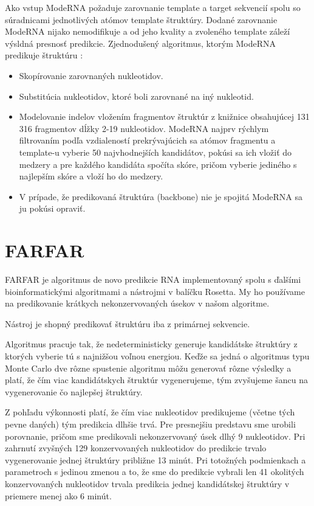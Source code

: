 \indent Ako vstup ModeRNA požaduje zarovnanie  template a target sekvencií spolu so súradnicami jednotlivých atómov template štruktúry. Dodané zarovnanie ModeRNA nijako nemodifikuje a od jeho kvality a zvoleného template záleží výsldná presnosť predikcie. 
Zjednodušený algoritmus, ktorým ModeRNA predikuje štruktúru \cite{Rother11}: 

\begin{itemize}
\item Skopírovanie zarovnaných nukleotidov.
\item Substitúcia nukleotidov, ktoré boli zarovnané na iný nukleotid.
\item Modelovanie indelov vložením fragmentov štruktúr z knižnice obsahujúcej 131 316 fragmentov dĺžky 2-19 nukleotidov. ModeRNA najprv rýchlym filtrovaním podľa vzdialeností  prekrývajúcich sa atómov fragmentu a template-u vyberie 50 najvhodnejších kandidátov, pokúsi sa ich vložiť do medzery a pre každého kandidáta spočíta skóre, pričom vyberie jediného s najlepším skóre a  vloží ho do medzery.
\item V prípade, že predikovaná štruktúra (backbone) nie je spojitá ModeRNA sa ju pokúsi opraviť.
\end{itemize}


\section{FARFAR}

FARFAR je algoritmus de novo predikcie RNA implementovaný spolu s ďalšími bioinformatickými algoritmami a nástrojmi v balíčku Rosetta. My ho používame na predikovanie krátkych nekonzervovaných úsekov v našom algoritme.  


\indent Nástroj je shopný predikovať štruktúru iba z primárnej sekvencie. 


\indent Algoritmus pracuje tak, že nedeterministicky generuje kandidátske štruktúry z ktorých vyberie tú s najnižšou voľnou energiou. Keďže sa jedná o algoritmus typu Monte Carlo dve rôzne spustenie algoritmu môžu generovať rôzne výsledky a platí, že čím viac kandidátskych štruktúr vygenerujeme, tým zvyšujeme šancu na vygenerovanie čo najlepšej štruktúry.


\indent Z pohľadu výkonnosti platí, že čím viac nukleotidov predikujeme (včetne tých pevne daných) tým predikcia dlhšie trvá. Pre presnejšiu predstavu sme urobili porovnanie, pričom sme predikovali nekonzervovaný úsek dlhý 9 nukleotidov. Pri zahrnutí zvyšných 129 konzervovaných nukleotidov do predikcie trvalo vygenerovanie jednej štruktúry približne 13 minút. Pri totožných podmienkach a parametroch s jedinou zmenou a to, že sme do predikcie vybrali len 41 okolitých konzervovaných nukleotidov trvala predikcia jednej kandidátskej štruktúry v priemere menej ako 6 minút.


